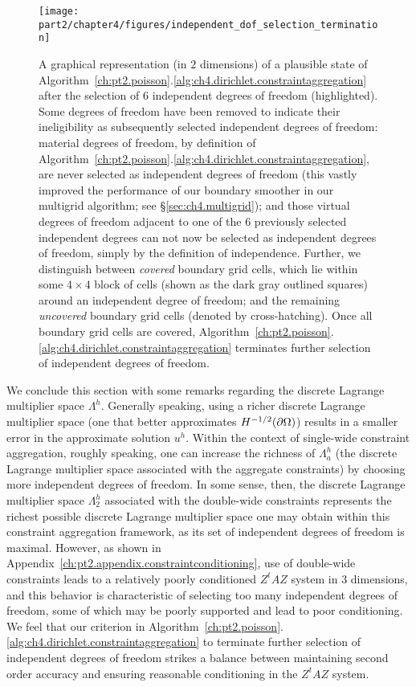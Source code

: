 \begin{figure}[htbp]
\begin{center}
\texttt{[image: part2/chapter4/figures/independent\_dof\_selection\_termination]}
\caption{A graphical representation (in $2$ dimensions) of a plausible state of Algorithm~\ref{ch:pt2.poisson}.\ref{alg:ch4.dirichlet.constraintaggregation} after the selection of $6$ independent degrees of freedom (highlighted). Some degrees of freedom have been removed to indicate their ineligibility as subsequently selected independent degrees of freedom: material degrees of freedom, by definition of Algorithm~\ref{ch:pt2.poisson}.\ref{alg:ch4.dirichlet.constraintaggregation}, are never selected as independent degrees of freedom (this vastly improved the performance of our boundary smoother in our multigrid algorithm; see \S\ref{sec:ch4.multigrid}); and those virtual degrees of freedom adjacent to one of the $6$ previously selected independent degrees can not now be selected as independent degrees of freedom, simply by the definition of independence. Further, we distinguish between \emph{covered} boundary grid cells, which lie within some $4 \times 4$ block of cells (shown as the dark gray outlined squares) around an independent degree of freedom; and the remaining \emph{uncovered} boundary grid cells (denoted by cross-hatching). Once all boundary grid cells are covered, Algorithm~\ref{ch:pt2.poisson}.\ref{alg:ch4.dirichlet.constraintaggregation} terminates further selection of independent degrees of freedom.}
\label{fig:ch4.indydoftermination}
\end{center}
\end{figure}

We conclude this section with some remarks regarding the discrete Lagrange multiplier space $\Lambda^h$. Generally speaking, using a richer discrete Lagrange multiplier space (one that better approximates $H^{-1/2}(\partial\Omega)$) results in a smaller error in the approximate solution $u^h$. Within the context of single-wide constraint aggregation, roughly speaking, one can increase the richness of $\Lambda^h_a$ (the discrete Lagrange multiplier space associated with the aggregate constraints) by choosing more independent degrees of freedom. In some sense, then, the discrete Lagrange multiplier space $\Lambda^h_2$ associated with the double-wide constraints represents the richest possible discrete Lagrange multiplier space one may obtain within this constraint aggregation framework, as its set of independent degrees of freedom is maximal. However, as shown in Appendix~\ref{ch:pt2.appendix.constraintconditioning}, use of double-wide constraints leads to a relatively poorly conditioned $Z^tAZ$ system in $3$ dimensions, and this behavior is characteristic of selecting too many independent degrees of freedom, some of which may be poorly supported and lead to poor conditioning. We feel that our criterion in Algorithm~\ref{ch:pt2.poisson}.\ref{alg:ch4.dirichlet.constraintaggregation} to terminate further selection of independent degrees of freedom strikes a balance between maintaining second order accuracy and ensuring reasonable conditioning in the $Z^tAZ$ system.

